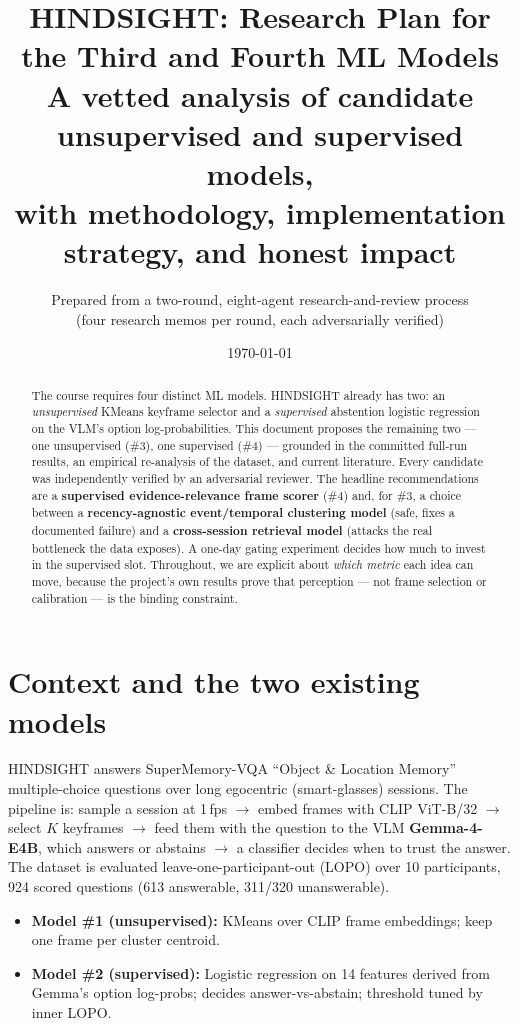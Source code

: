 \documentclass[11pt]{article}
\title{\vspace{-1.2cm}\textbf{HINDSIGHT: Research Plan for the Third and Fourth ML Models}\\[2pt]
\large A vetted analysis of candidate unsupervised and supervised models,\\ with methodology, implementation strategy, and honest impact}
\author{Prepared from a two-round, eight-agent research-and-review process\\ (four research memos per round, each adversarially verified)}
\date{\today}
\begin{document}
\maketitle
\thispagestyle{fancy}
\vspace{-0.6cm}

\begin{abstract}
\noindent The course requires four distinct ML models. HINDSIGHT already has two: an \emph{unsupervised} KMeans keyframe selector and a \emph{supervised} abstention logistic regression on the VLM's option log-probabilities. This document proposes the remaining two --- one unsupervised (\#3), one supervised (\#4) --- grounded in the committed full-run results, an empirical re-analysis of the dataset, and current literature. Every candidate was independently verified by an adversarial reviewer. The headline recommendations are a \textbf{supervised evidence-relevance frame scorer} (\#4) and, for \#3, a choice between a \textbf{recency-agnostic event/temporal clustering model} (safe, fixes a documented failure) and a \textbf{cross-session retrieval model} (attacks the real bottleneck the data exposes). A one-day gating experiment decides how much to invest in the supervised slot. Throughout, we are explicit about \emph{which metric} each idea can move, because the project's own results prove that perception --- not frame selection or calibration --- is the binding constraint.
\end{abstract}

\section{Context and the two existing models}
HINDSIGHT answers SuperMemory-VQA ``Object \& Location Memory'' multiple-choice questions over long egocentric (smart-glasses) sessions. The pipeline is: sample a session at 1\,fps $\rightarrow$ embed frames with CLIP ViT-B/32 $\rightarrow$ select $K$ keyframes $\rightarrow$ feed them with the question to the VLM \textbf{Gemma-4-E4B}, which answers or abstains $\rightarrow$ a classifier decides when to trust the answer. The dataset is evaluated leave-one-participant-out (LOPO) over 10 participants, 924 scored questions (613 answerable, 311/320 unanswerable).

\begin{itemize}[leftmargin=1.4em,topsep=2pt,itemsep=1pt]
\item \textbf{Model \#1 (unsupervised):} KMeans over CLIP frame embeddings; keep one frame per cluster centroid.
\item \textbf{Model \#2 (supervised):} Logistic regression on 14 features derived from Gemma's option log-probs; decides answer-vs-abstain; threshold tuned by inner LOPO.
\end{itemize}
\end{document}
